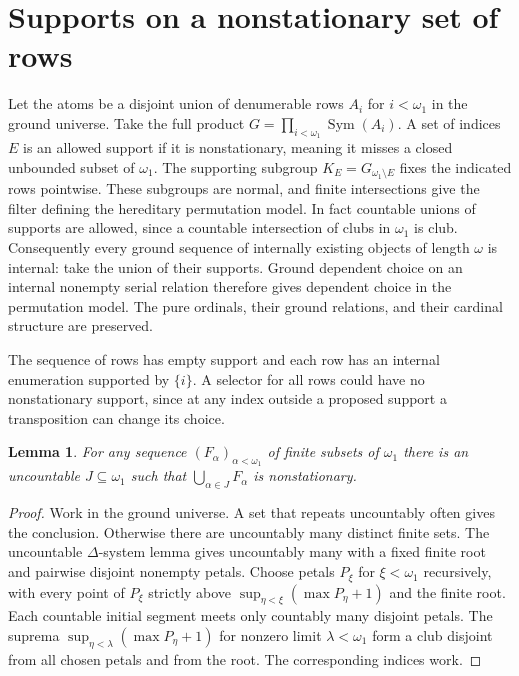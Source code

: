 \documentclass[11pt]{article}
\newtheorem{lemma}[theorem]{Lemma}
\begin{document}
\section{Supports on a nonstationary set of rows}
Let the atoms be a disjoint union of denumerable rows $A_i$ for $i<\omega_1$ in the ground universe. Take the full product $G=\prod_{i<\omega_1}\operatorname{Sym}(A_i)$. A set of indices $E$ is an allowed support if it is nonstationary, meaning it misses a closed unbounded subset of $\omega_1$. The supporting subgroup $K_E=G_{\omega_1\setminus E}$ fixes the indicated rows pointwise. These subgroups are normal, and finite intersections give the filter defining the hereditary permutation model. In fact countable unions of supports are allowed, since a countable intersection of clubs in $\omega_1$ is club. Consequently every ground sequence of internally existing objects of length $\omega$ is internal: take the union of their supports. Ground dependent choice on an internal nonempty serial relation therefore gives dependent choice in the permutation model. The pure ordinals, their ground relations, and their cardinal structure are preserved.

The sequence of rows has empty support and each row has an internal enumeration supported by $\{i\}$. A selector for all rows could have no nonstationary support, since at any index outside a proposed support a transposition can change its choice.

\begin{lemma}\label{thin}
For any sequence $(F_\alpha)_{\alpha<\omega_1}$ of finite subsets of $\omega_1$ there is an uncountable $J\subseteq\omega_1$ such that $\bigcup_{\alpha\in J}F_\alpha$ is nonstationary.
\end{lemma}
\begin{proof}
Work in the ground universe. A set that repeats uncountably often gives the conclusion. Otherwise there are uncountably many distinct finite sets. The uncountable $\Delta$-system lemma gives uncountably many with a fixed finite root and pairwise disjoint nonempty petals. Choose petals $P_\xi$ for $\xi<\omega_1$ recursively, with every point of $P_\xi$ strictly above $\sup_{\eta<\xi}(\max P_\eta+1)$ and the finite root. Each countable initial segment meets only countably many disjoint petals. The suprema $\sup_{\eta<\lambda}(\max P_\eta+1)$ for nonzero limit $\lambda<\omega_1$ form a club disjoint from all chosen petals and from the root. The corresponding indices work.
\end{proof}
\end{document}
